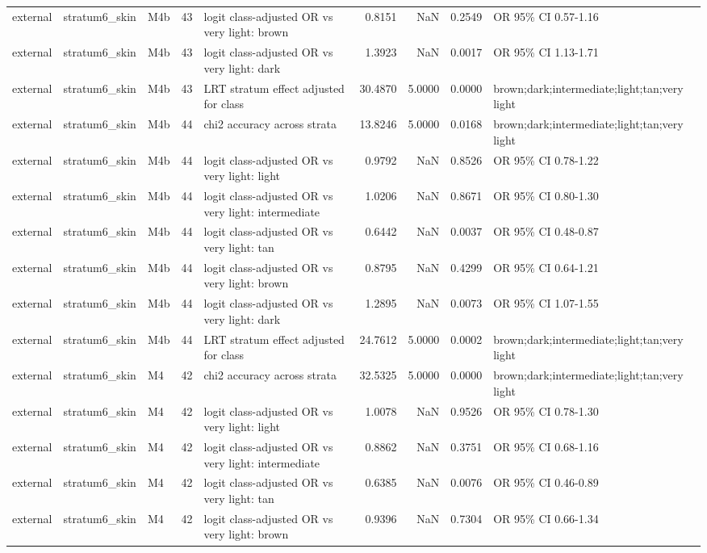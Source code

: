 \begin{tabular}{lllrlrrrl}
external & stratum6\_skin & M4b & 43 & logit class-adjusted OR vs very light: brown & 0.8151 & NaN & 0.2549 & OR 95\% CI 0.57-1.16 \\
external & stratum6\_skin & M4b & 43 & logit class-adjusted OR vs very light: dark & 1.3923 & NaN & 0.0017 & OR 95\% CI 1.13-1.71 \\
external & stratum6\_skin & M4b & 43 & LRT stratum effect adjusted for class & 30.4870 & 5.0000 & 0.0000 & brown;dark;intermediate;light;tan;very light \\
external & stratum6\_skin & M4b & 44 & chi2 accuracy across strata & 13.8246 & 5.0000 & 0.0168 & brown;dark;intermediate;light;tan;very light \\
external & stratum6\_skin & M4b & 44 & logit class-adjusted OR vs very light: light & 0.9792 & NaN & 0.8526 & OR 95\% CI 0.78-1.22 \\
external & stratum6\_skin & M4b & 44 & logit class-adjusted OR vs very light: intermediate & 1.0206 & NaN & 0.8671 & OR 95\% CI 0.80-1.30 \\
external & stratum6\_skin & M4b & 44 & logit class-adjusted OR vs very light: tan & 0.6442 & NaN & 0.0037 & OR 95\% CI 0.48-0.87 \\
external & stratum6\_skin & M4b & 44 & logit class-adjusted OR vs very light: brown & 0.8795 & NaN & 0.4299 & OR 95\% CI 0.64-1.21 \\
external & stratum6\_skin & M4b & 44 & logit class-adjusted OR vs very light: dark & 1.2895 & NaN & 0.0073 & OR 95\% CI 1.07-1.55 \\
external & stratum6\_skin & M4b & 44 & LRT stratum effect adjusted for class & 24.7612 & 5.0000 & 0.0002 & brown;dark;intermediate;light;tan;very light \\
external & stratum6\_skin & M4 & 42 & chi2 accuracy across strata & 32.5325 & 5.0000 & 0.0000 & brown;dark;intermediate;light;tan;very light \\
external & stratum6\_skin & M4 & 42 & logit class-adjusted OR vs very light: light & 1.0078 & NaN & 0.9526 & OR 95\% CI 0.78-1.30 \\
external & stratum6\_skin & M4 & 42 & logit class-adjusted OR vs very light: intermediate & 0.8862 & NaN & 0.3751 & OR 95\% CI 0.68-1.16 \\
external & stratum6\_skin & M4 & 42 & logit class-adjusted OR vs very light: tan & 0.6385 & NaN & 0.0076 & OR 95\% CI 0.46-0.89 \\
external & stratum6\_skin & M4 & 42 & logit class-adjusted OR vs very light: brown & 0.9396 & NaN & 0.7304 & OR 95\% CI 0.66-1.34 \\

\end{tabular}
